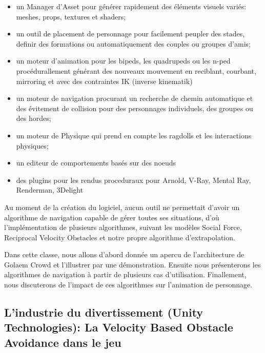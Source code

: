 \documentclass[11pt]{report}
\begin{document}
\begin{itemize}
	\item un Manager d'Asset pour générer rapidement des éléments visuels variés: meshes, props, textures et shaders;
	\item un outil de placement de personnage pour facilement peupler des stades, definir des formations ou automatiquement des couples ou groupes d'amis;
	\item un moteur d'animation pour les bipeds, les quadrupeds ou les n-ped procédurallement générant des nouveaux mouvement en reciblant, courbant, mirroring et avec des contraintes IK (inverse kinematik)
	\item un moteur de navigation procurant un recherche de chemin automatique et des évitement de collision pour des personnages individuels, des groupes ou des hordes;
	\item un moteur de Physique qui prend en compte les ragdolls et les interactions physiques;
	\item un editeur de comportements basés sur des noeuds 
	\item des plugins pour les rendus proceduraux pour Arnold, V-Ray, Mental Ray, Renderman, 3Delight
	 	
\end{itemize}

Au moment de la création du logiciel, aucun outil ne permettait d'avoir un algorithme de navigation capable de gérer toutes ses situations, d'où l'implémentation de plusieurs algorithmes, suivant les modèles Social Force, Reciprocal Velocity Obstacles et notre propre algorithme d'extrapolation.

Dans cette classe, nous allons d'abord donnée un apercu de l'architecture de Golaem Crowd et l'illustrer par une démonstration. Ensuite nous présenterons les algorithmes de navigation à partir de plusieurs cas d'utilisation. Finallement, nous discuterons de l'impact de ces algorithmes sur l'animation de personnage.

\subsection{L'industrie du divertissement (Unity Technologies): La Velocity Based Obstacle Avoidance dans le jeu}
\end{document}
